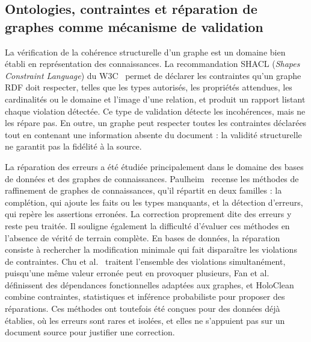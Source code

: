 \subsection{Ontologies, contraintes et réparation de graphes comme mécanisme de validation}

La vérification de la cohérence structurelle d'un graphe est un domaine bien établi en représentation des connaissances. La recommandation SHACL (\textit{Shapes Constraint Language}) du W3C~\cite{shacl2017} permet de déclarer les contraintes qu'un graphe RDF doit respecter, telles que les types autorisés, les propriétés attendues, les cardinalités ou le domaine et l'image d'une relation, et produit un rapport listant chaque violation détectée. Ce type de validation détecte les incohérences, mais ne les répare pas. En outre, un graphe peut respecter toutes les contraintes déclarées tout en contenant une information absente du document : la validité structurelle ne garantit pas la fidélité à la source.

La réparation des erreurs a été étudiée principalement dans le domaine des bases de données et des graphes de connaissances. Paulheim~\cite{paulheim2017refinement} recense les méthodes de raffinement de graphes de connaissances, qu'il répartit en deux familles : la complétion, qui ajoute les faits ou les types manquants, et la détection d'erreurs, qui repère les assertions erronées. La correction proprement dite des erreurs y reste peu traitée. Il souligne également la difficulté d'évaluer ces méthodes en l'absence de vérité de terrain complète. En bases de données, la réparation consiste à rechercher la modification minimale qui fait disparaître les violations de contraintes. Chu et al.~\cite{chu2013holistic} traitent l'ensemble des violations simultanément, puisqu'une même valeur erronée peut en provoquer plusieurs, Fan et al.~\cite{fan2016gfd} définissent des dépendances fonctionnelles adaptées aux graphes, et HoloClean~\cite{rekatsinas2017holoclean} combine contraintes, statistiques et inférence probabiliste pour proposer des réparations. Ces méthodes ont toutefois été conçues pour des données déjà établies, où les erreurs sont rares et isolées, et elles ne s'appuient pas sur un document source pour justifier une correction.

